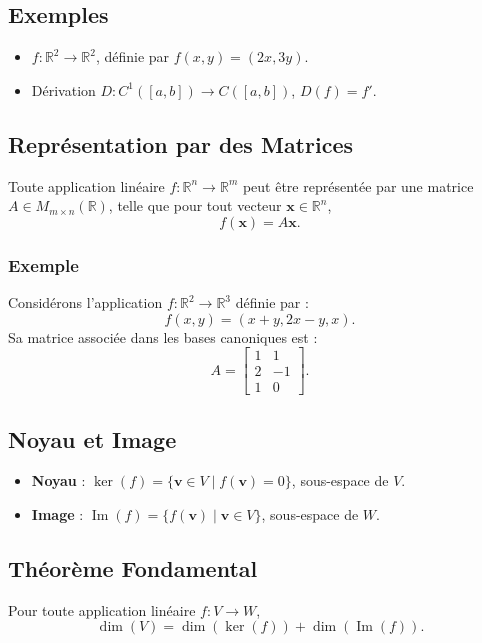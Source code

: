 \documentclass[12pt,a4paper]{article}
\begin{document}
\subsection*{Exemples}
\begin{itemize}
    \item \( f : \mathbb{R}^2 \to \mathbb{R}^2 \), définie par \( f(x, y) = (2x, 3y) \).
    \item Dérivation \( D : C^1([a, b]) \to C([a, b]) \), \( D(f) = f' \).
\end{itemize}

\subsection*{Représentation par des Matrices}
Toute application linéaire \( f : \mathbb{R}^n \to \mathbb{R}^m \) peut être représentée par une matrice \( A \in M_{m \times n}(\mathbb{R}) \), telle que pour tout vecteur \( \mathbf{x} \in \mathbb{R}^n \),
\[
f(\mathbf{x}) = A \mathbf{x}.
\]

\subsubsection*{Exemple}
Considérons l'application \( f : \mathbb{R}^2 \to \mathbb{R}^3 \) définie par :
\[
f(x, y) = (x + y, 2x - y, x).
\]
Sa matrice associée dans les bases canoniques est :
\[
A = \begin{bmatrix}
1 & 1 \\
2 & -1 \\
1 & 0
\end{bmatrix}.
\]

\subsection*{Noyau et Image}
\begin{itemize}
    \item \textbf{Noyau} : \( \ker(f) = \{\mathbf{v} \in V \mid f(\mathbf{v}) = 0 \} \), sous-espace de \( V \).
    \item \textbf{Image} : \( \operatorname{Im}(f) = \{f(\mathbf{v}) \mid \mathbf{v} \in V \} \), sous-espace de \( W \).
\end{itemize}

\subsection*{Théorème Fondamental}
Pour toute application linéaire \( f : V \to W \),
\[
\dim(V) = \dim(\ker(f)) + \dim(\operatorname{Im}(f)).
\]
\end{document}
